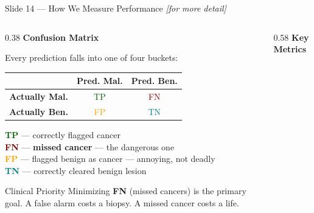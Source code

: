 \documentclass[aspectratio=169, 9pt]{beamer}
\begin{document}
\begin{frame}{Slide 14 --- How We Measure Performance \hfill{\small\textit{[for more detail]}}}

  \begin{columns}[T]

    \begin{column}{0.38\textwidth}
      \textbf{\color{navyblue}Confusion Matrix}

      \vspace{0.3em}
      {\small Every prediction falls into one of four buckets:}

      \vspace{0.3em}
      {\small
      \begin{tabular}{@{} r | c c @{}}
        & \textbf{Pred. Mal.} & \textbf{Pred. Ben.} \\
        \hline
        \textbf{Actually Mal.} & \textcolor{darkgreen}{TP} & \textcolor{darkred}{FN} \\
        \textbf{Actually Ben.} & \textcolor{orange}{FP}    & \textcolor{teal}{TN} \\
      \end{tabular}
      }

      \vspace{0.4em}
      {\scriptsize
      \textcolor{darkgreen}{\textbf{TP}} — correctly flagged cancer\\
      \textcolor{darkred}{\textbf{FN}} — \textbf{missed cancer} --- the dangerous one\\
      \textcolor{orange}{\textbf{FP}} — flagged benign as cancer --- annoying, not deadly\\
      \textcolor{teal}{\textbf{TN}} — correctly cleared benign lesion
      }

      \vspace{0.4em}
      \begin{alertblock}{Clinical Priority}
        \scriptsize Minimizing \textbf{FN} (missed cancers) is the primary goal.
        A false alarm costs a biopsy.
        A missed cancer costs a life.
      \end{alertblock}
    \end{column}

    \begin{column}{0.58\textwidth}
      \textbf{\color{navyblue}Key Metrics}


\end{column}
\end{columns}
\end{frame}
\end{document}

